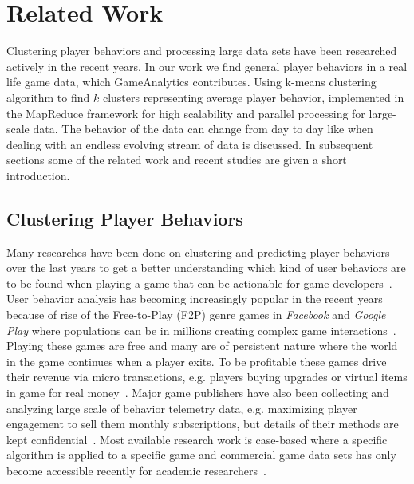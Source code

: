 
\chapter{Related Work} %
\label{Chapter3}

Clustering player behaviors and processing large data sets have been researched actively in the recent years. In our work we find general player behaviors in a real life game data, which GameAnalytics contributes. Using k-means clustering algorithm to find $k$ clusters representing average player behavior, implemented in the MapReduce framework for high scalability and parallel processing for large-scale data. The behavior of the data can change from day to day like when dealing with an endless evolving stream of data is discussed. In subsequent sections some of the related work and recent studies are given a short introduction.

\section{Clustering Player Behaviors}
Many researches have been done on clustering and predicting player behaviors over the last years to get a better understanding which kind of user behaviors are to be found when playing a game that can be actionable for game developers~\citep{Marsh:2006Continuous, Missura2009Player, Thurau:2009SVIM, Drachen:2011Evaluating, Drachen:2012}. User behavior analysis has becoming increasingly popular in the recent years because of rise of the Free-to-Play (F2P) genre games in \textit{Facebook} and \textit{Google Play} where populations can be in millions creating complex game interactions~\citep{Kim:2008Tracking, Drachen:2011Evaluating}. Playing these games are free and many are of persistent nature where the world in the game continues when a player exits. To be profitable these games drive their revenue via micro transactions, e.g. players buying upgrades or virtual items in game for real money~\citep{Kim:2008Tracking, Drachen:2011Evaluating, Fields:2011SocialGame, Seif:2013GameAnalytics}. Major game publishers have also been collecting and analyzing large scale of behavior telemetry data, e.g. maximizing player engagement to sell them monthly subscriptions, but details of their methods are kept confidential~\citep{Zoeller:2010, Yannakakis:2012}. Most available research work is case-based where a specific algorithm is applied to a specific game and commercial game data sets has only become accessible recently for academic researchers~\citep{Yannakakis:2012}.

